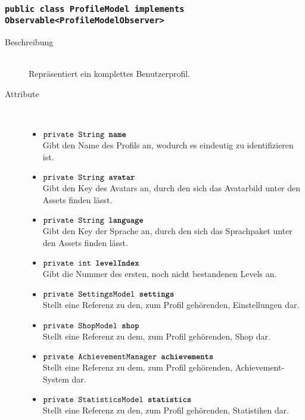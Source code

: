 \subsubsection{\normalfont \texttt{public class \textbf{ProfileModel} implements Observable<ProfileModelObserver>}}

\begin{description}
\item[Beschreibung] \hfill \\ Repräsentiert ein komplettes Benutzerprofil.

\item[Attribute] \hfill \\
	\vspace{-.8cm}
	\begin{itemize}
		\item $\texttt{private String \textbf{name}}$ \\ Gibt den Name des Profils an, wodurch es eindeutig zu identifizieren ist. 
		\item $\texttt{private String \textbf{avatar}}$ \\ Gibt den Key des Avatars an, durch den sich das Avatarbild unter den Assets finden lässt.
		\item $\texttt{private String \textbf{language}}$ \\ Gibt den Key der Sprache an, durch den sich das Sprachpaket unter den Assets finden lässt.
		\item $\texttt{private int \textbf{levelIndex}}$ \\ Gibt die Nummer des ersten, noch nicht bestandenen Levels an.
		\item $\texttt{private SettingsModel \textbf{settings}}$ \\ Stellt eine Referenz zu den, zum Profil gehörenden, Einstellungen dar.
		\item $\texttt{private ShopModel \textbf{shop}}$ \\ Stellt eine Referenz zu dem, zum Profil gehörenden, Shop dar.
		\item $\texttt{private AchievementManager \textbf{achievements}}$ \\ Stellt eine Referenz zu dem, zum Profil gehörenden, Achievement-System dar.
		\item $\texttt{private StatisticsModel \textbf{statistics}}$ \\ Stellt eine Referenz zu den, zum Profil gehörenden, Statistiken dar.
	\end{itemize}
	

\end{description}
